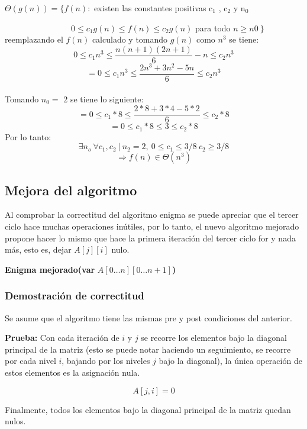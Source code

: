 \documentclass[11pt]{article}
\begin{document}
\( \Theta (g(n))  =  \{ f (n) :\) existen las constantes positivas c$_1$ , c$_2$ y n$_0$ 

\ \ \ \ \ \ \ \ \ \ \ \ \ \ \ \ \(0\leq  c_1 g (n) \leq f (n) \leq c_2 g (n)\) para todo \( n \geq n0 \ \}  \)\\

reemplazando el \(f(n)\) calculado y tomando \(g(n)\) como \(n^3\) se tiene:
\[0 \leq  c_1 n^3 \leq \frac{n(n+1)(2n+1)}{6} - n \leq c_2 n^3\]
\[= 0 \leq  c_1 n^3 \leq \frac{2n^3+3n^2-5n}{6} \leq c_2 n^3\]\\

Tomando \(n_0 = \) 2 se tiene lo siguiente:
\[= 0 \leq  c_1 * 8 \leq \frac{2*8+3*4-5*2}{6} \leq c_2 * 8\]
\[= 0 \leq  c_1 * 8 \leq 3 \leq c_2 * 8\]
Por lo tanto:
\[ \exists n_o\  \forall c_1,c_2 \ | \ n_2 = 2,\ 0 \leq c_1 \leq 3/8 \ c_2 \geq 3/8 \]
\[\Rightarrow f(n) \in \Theta(n^3)\]
\subsection{Mejora del algoritmo}
Al comprobar la correctitud del algoritmo enigma se puede apreciar que el tercer ciclo hace muchas operaciones inútiles, por lo tanto, el nuevo algoritmo mejorado propone hacer lo mismo que hace la primera iteración del tercer ciclo for y nada más, esto es, dejar \(A[j][i]\) nulo.

\begin{algorithm}[H]
\caption{\textbf{Enigma mejorado}\textbf{(var} $A[0 \dots n][0 \dots n + 1]$\textbf{)}}

\end{algorithm}
\subsubsection{Demostración de correctitud}
Se asume que el algoritmo tiene las mismas pre y post condiciones del anterior.

\textbf{Prueba:} 
Con cada iteración de \(i\) y \(j\) se recorre los elementos bajo la diagonal principal de la matriz (esto se puede notar haciendo un seguimiento, se recorre por cada nivel \(i\), bajando por los niveles \(j\) bajo la diagonal), la única operación de estos elementos es la asignación nula.

\[A[j,i] = 0 \]
 
Finalmente, todos los elementos bajo la diagonal principal de la matriz quedan nulos.
\end{document}
